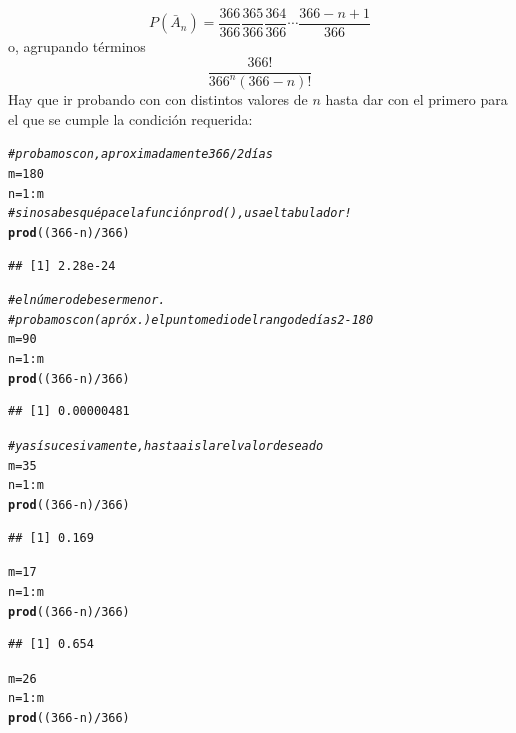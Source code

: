 \documentclass[10pt,a4paper]{article}\usepackage[]{graphicx}\usepackage[]{color}
\makeatletter
\newcommand{\hlnum}[1]{\textcolor[rgb]{0.686,0.059,0.569}{#1}}%
\newcommand{\hlcom}[1]{\textcolor[rgb]{0.678,0.584,0.686}{\textit{#1}}}%
\newcommand{\hlopt}[1]{\textcolor[rgb]{0,0,0}{#1}}%
\newcommand{\hlstd}[1]{\textcolor[rgb]{0.345,0.345,0.345}{#1}}%
\newcommand{\hlkwb}[1]{\textcolor[rgb]{0.69,0.353,0.396}{#1}}%
\newcommand{\hlkwd}[1]{\textcolor[rgb]{0.737,0.353,0.396}{\textbf{#1}}}%
\newenvironment{kframe}{%
 \def\at@end@of@kframe{}%
 \ifinner\ifhmode%
  \def\at@end@of@kframe{\end{minipage}}%
  \begin{minipage}{\columnwidth}%
 \fi\fi%
 \def\FrameCommand##1{\hskip\@totalleftmargin \hskip-\fboxsep
 \colorbox{shadecolor}{##1}\hskip-\fboxsep
     \hskip-\linewidth \hskip-\@totalleftmargin \hskip\columnwidth}%
 \MakeFramed {\advance\hsize-\width
   \@totalleftmargin\z@ \linewidth\hsize
   \@setminipage}}%
 {\par\unskip\endMakeFramed%
 \at@end@of@kframe}
\newenvironment{knitrout}{}{} %
\makeatother
\begin{document}
$$ P(\bar A_n) =\dfrac{366}{366}\dfrac{365}{366}
\dfrac{364}{366}\cdots \dfrac{366-n+1}{366}$$
o, agrupando términos
$$\frac{366!}{366^n(366-n)!}$$
Hay que ir probando con con distintos valores de $n$ hasta dar con el primero para el que se cumple la condición requerida: 
\begin{knitrout}
\color{fgcolor}\begin{kframe}
\begin{alltt}
\hlcom{# probamos con, aproximadamente 366/2 días}
\hlstd{m} \hlkwb{=}\hlnum{180}
\hlstd{n} \hlkwb{=} \hlnum{1}\hlopt{:}\hlstd{m}
\hlcom{# si no sabes qué pace la función prod(), usa el tabulador!}
\hlkwd{prod}\hlstd{((}\hlnum{366}\hlopt{-}\hlstd{n)}\hlopt{/}\hlnum{366}\hlstd{)}
\end{alltt}
\begin{verbatim}
## [1] 2.28e-24
\end{verbatim}
\begin{alltt}
\hlcom{# elnúmero debe ser menor. }
\hlcom{# probamos con (apróx.) el punto medio del rango de días 2-180}
\hlstd{m} \hlkwb{=}\hlnum{90}
\hlstd{n} \hlkwb{=} \hlnum{1}\hlopt{:}\hlstd{m}
\hlkwd{prod}\hlstd{((}\hlnum{366}\hlopt{-}\hlstd{n)}\hlopt{/}\hlnum{366}\hlstd{)}
\end{alltt}
\begin{verbatim}
## [1] 0.00000481
\end{verbatim}
\begin{alltt}
\hlcom{# y así sucesivamente, hasta aislar el valor deseado}
\hlstd{m} \hlkwb{=}\hlnum{35}
\hlstd{n} \hlkwb{=} \hlnum{1}\hlopt{:}\hlstd{m}
\hlkwd{prod}\hlstd{((}\hlnum{366}\hlopt{-}\hlstd{n)}\hlopt{/}\hlnum{366}\hlstd{)}
\end{alltt}
\begin{verbatim}
## [1] 0.169
\end{verbatim}
\begin{alltt}
\hlstd{m} \hlkwb{=}\hlnum{17}
\hlstd{n} \hlkwb{=} \hlnum{1}\hlopt{:}\hlstd{m}
\hlkwd{prod}\hlstd{((}\hlnum{366}\hlopt{-}\hlstd{n)}\hlopt{/}\hlnum{366}\hlstd{)}
\end{alltt}
\begin{verbatim}
## [1] 0.654
\end{verbatim}
\begin{alltt}
\hlstd{m} \hlkwb{=}\hlnum{26}
\hlstd{n} \hlkwb{=} \hlnum{1}\hlopt{:}\hlstd{m}
\hlkwd{prod}\hlstd{((}\hlnum{366}\hlopt{-}\hlstd{n)}\hlopt{/}\hlnum{366}\hlstd{)}
\end{alltt}
\begin{verbatim}

\end{verbatim}
\end{kframe}
\end{knitrout}
\end{document}
